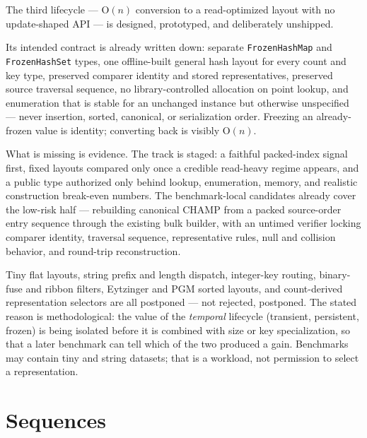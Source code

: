 \documentclass[11pt,twoside,openright]{book}
\newcommand{\code}[1]{\texorpdfstring{\textcolor{d7ink}{\texttt{#1}}}{#1}}
\newcommand{\bigoh}[1]{$\mathrm{O}(#1)$}
\begin{document}
The third lifecycle --- \bigoh{n} conversion to a read-optimized layout with no
update-shaped API --- is designed, prototyped, and deliberately unshipped.

Its intended contract is already written down: separate \code{FrozenHashMap} and
\code{FrozenHashSet} types, one offline-built general hash layout for every count
and key type, preserved comparer identity and stored representatives, preserved
source traversal sequence, no library-controlled allocation on point lookup, and
enumeration that is stable for an unchanged instance but otherwise unspecified
--- never insertion, sorted, canonical, or serialization order. Freezing an
already-frozen value is identity; converting back is visibly \bigoh{n}.

What is missing is evidence. The track is staged: a faithful packed-index signal
first, fixed layouts compared only once a credible read-heavy regime appears, and
a public type authorized only behind lookup, enumeration, memory, and realistic
construction break-even numbers. The benchmark-local candidates already cover the
low-risk half --- rebuilding canonical CHAMP from a packed source-order entry
sequence through the existing bulk builder, with an untimed verifier locking
comparer identity, traversal sequence, representative rules, null and collision
behavior, and round-trip reconstruction.

\begin{asidebox}
Tiny flat layouts, string prefix and length dispatch, integer-key routing,
binary-fuse and ribbon filters, Eytzinger and PGM sorted layouts, and
count-derived representation selectors are all postponed --- not rejected,
postponed. The stated reason is methodological: the value of the \emph{temporal}
lifecycle (transient, persistent, frozen) is being isolated before it is
combined with size or key specialization, so that a later benchmark can tell
which of the two produced a gain. Benchmarks may contain tiny and string
datasets; that is a workload, not permission to select a representation.
\end{asidebox}

\part{Sequences}
\label{part:sequences}
\end{document}
